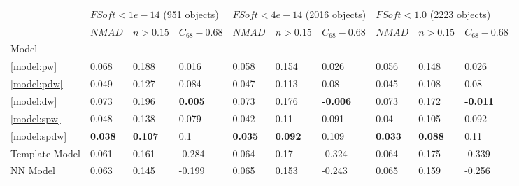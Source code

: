 \documentclass[fleqn,usenatbib]{mnras}
\begin{document}
\begin{table}
	\begin{tabular}{llllllllll}
            \hline
            {} & \multicolumn{3}{l}{$FSoft < 1e-14$ (951 objects)} & \multicolumn{3}{l}{$FSoft < 4e-14$ (2016 objects)} & \multicolumn{3}{l}{$FSoft < 1.0$ (2223 objects)} \\
            {} &                        $NMAD$ &        $n>0.15$ & $C_{68} - 0.68$ &                         $NMAD$ &        $n>0.15$ &  $C_{68} - 0.68$ &                       $NMAD$ &        $n>0.15$ &  $C_{68} - 0.68$ \\
            Model            &                               &                 &                 &                                &                 &                  &                              &                 &                  \\
            \hline
            \ref{model:pw}   &                         0.068 &           0.188 &           0.016 &                          0.058 &           0.154 &            0.026 &                        0.056 &           0.148 &            0.026 \\
            \ref{model:pdw}  &                         0.049 &           0.127 &           0.084 &                          0.047 &           0.113 &             0.08 &                        0.045 &           0.108 &             0.08 \\
            \ref{model:dw}   &                         0.073 &           0.196 &  \textbf{0.005} &                          0.073 &           0.176 &  \textbf{-0.006} &                        0.073 &           0.172 &  \textbf{-0.011} \\
            \ref{model:spw}  &                         0.048 &           0.138 &           0.079 &                          0.042 &            0.11 &            0.091 &                         0.04 &           0.105 &            0.092 \\
            \ref{model:spdw} &                \textbf{0.038} &  \textbf{0.107} &             0.1 &                 \textbf{0.035} &  \textbf{0.092} &            0.109 &               \textbf{0.033} &  \textbf{0.088} &             0.11 \\
            Template Model   &                         0.061 &           0.161 &          -0.284 &                          0.064 &            0.17 &           -0.324 &                        0.064 &           0.175 &           -0.339 \\
            NN Model         &                         0.063 &           0.145 &          -0.199 &                          0.065 &           0.153 &           -0.243 &                        0.065 &           0.159 &           -0.256 \\

\end{tabular}
\end{table}
\end{document}
